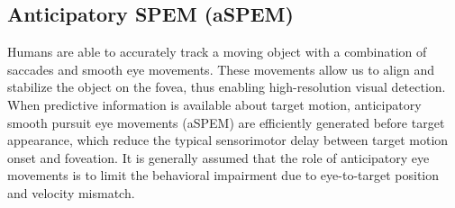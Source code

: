 \documentclass[profile,final,english, draft]{article}%
\newcommand{\citep}[1]{(\cite{#1})}
\begin{document}
%
%


\subsection{Anticipatory SPEM (aSPEM)}
Humans are able to accurately track a moving object with a combination of saccades and smooth eye movements. These movements allow us to align and stabilize the object on the fovea, thus enabling high-resolution visual detection. When predictive information is available about target motion, anticipatory smooth pursuit eye movements (aSPEM) are efficiently generated before target appearance, which reduce the typical sensorimotor delay between target motion onset and foveation. It is generally assumed that the role of anticipatory eye movements is to limit the behavioral impairment due to eye-to-target position and velocity mismatch.
\end{document}
